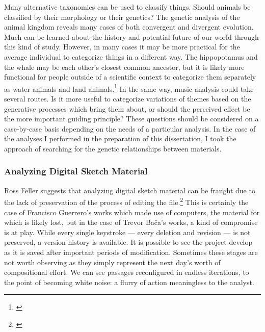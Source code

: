 Many alternative taxonomies can be used to classify things. Should animals be classified by their morphology or their genetics? The genetic analysis of the animal kingdom reveals many cases of both convergent and divergent evolution. Much can be learned about the history and potential future of our world through this kind of study. However, in many cases it may be more practical for the average individual to categorize things in a different way. The hippopotamus and the whale may be each other's closest common ancestor, but it is likely more functional for people outside of a scientific context to categorize them separately as water animals and land animals.\footnote{\citet{hippo}} In the same way, music analysis could take several routes. Is it more useful to categorize variations of themes based on the generative processes which bring them about, or should the perceived effect be the more important guiding principle? These questions should be considered on a case-by-case basis depending on the needs of a particular analysis. In the case of the analyses I performed in the preparation of this dissertation, I took the approach of searching for the genetic relationships between materials. %

\subsubsection{Analyzing Digital Sketch Material}

Ross Feller suggests that analyzing digital sketch material can be fraught due to the lack of preservation of the process of editing the file.\footnote{\citet[176]{sketches}} This is certainly the case of Francisco Guerrero's works which made use of computers, the material for which is likely lost, but in the case of Trevor Bača's works, a kind of compromise is at play. While every single keystroke — every deletion and revision — is not preserved, a version history is available. It is possible to see the project develop as it is saved after important periods of modification. Sometimes these stages are not worth observing as they simply represent the next day's worth of compositional effort. We can see passages reconfigured in endless iterations, to the point of becoming white noise: a flurry of action meaningless to the analyst.

